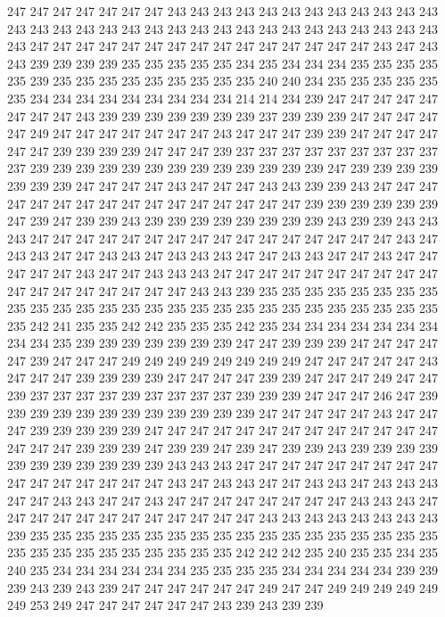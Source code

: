 247 247 247 247 247 247 247 243 243 243 243 243 243 243 243 243 243 243 243 243
243 243 243 243 243 243 243 243 243 243 243 243 243 243 243 243 243 243 243 247
247 247 247 247 247 247 247 247 247 247 247 247 247 247 243 247 243 243 239 239
239 239 235 235 235 235 235 234 235 234 234 234 235 235 235 235 235 239 235 235
235 235 235 235 235 235 235 240 240 234 235 235 235 235 235 235 234 234 234 234
234 234 234 234 234 214 214 234 239 247 247 247 247 247 247 247 247 243 239 239
239 239 239 239 239 237 239 239 239 247 247 247 247 247 249 247 247 247 247 247
247 247 243 247 247 247 239 239 247 247 247 247 247 247 239 239 239 239 247 247
247 239 237 237 237 237 237 237 237 237 237 237 239 239 239 239 239 239 239 239
239 239 239 239 239 247 239 239 239 239 239 239 239 247 247 247 247 243 247 247
247 243 243 239 239 243 247 247 247 247 247 247 247 247 247 247 247 247 247 247
247 247 239 239 239 239 239 239 247 239 247 239 239 243 239 239 239 239 239 239
239 239 243 239 239 243 243 243 247 247 247 247 247 247 247 247 247 247 247 247
247 247 247 247 243 247 243 243 247 247 243 243 247 243 243 243 247 247 243 243
247 247 243 247 247 247 247 247 243 247 247 243 243 243 247 247 247 247 247 247
247 247 247 247 247 247 247 247 247 247 247 247 243 243 239 235 235 235 235 235
235 235 235 235 235 235 235 235 235 235 235 235 235 235 235 235 235 235 235 235
235 235 235 242 241 235 235 242 242 235 235 235 242 235 234 234 234 234 234 234
234 234 234 235 239 239 239 239 239 239 239 247 247 239 239 239 247 247 247 247
247 239 247 247 247 249 249 249 249 249 249 249 249 247 247 247 247 247 243 247
247 247 239 239 239 239 247 247 247 247 239 239 247 247 247 249 247 247 239 237
237 237 237 239 237 237 237 237 239 239 239 247 247 247 246 247 239 239 239 239
239 239 239 239 239 239 239 239 247 247 247 247 247 243 247 247 247 239 239 239
239 239 247 247 247 247 247 247 247 247 247 247 247 247 247 247 247 247 239 239
239 247 239 239 247 239 247 239 239 243 239 239 239 239 239 239 239 239 239 239
239 243 243 243 247 247 247 247 247 247 247 247 247 247 247 247 247 247 247 247
243 247 243 243 247 247 243 243 247 243 243 243 247 247 243 243 247 247 243 247
247 247 247 247 247 247 247 243 243 243 247 247 247 247 247 247 247 247 247 247
247 247 243 243 243 243 243 243 243 243 239 235 235 235 235 235 235 235 235 235
235 235 235 235 235 235 235 235 235 235 235 235 235 235 235 235 235 235 235 242
242 242 235 240 235 235 234 235 240 235 234 234 234 234 234 234 235 235 235 235
234 234 234 234 234 239 239 239 243 239 243 239 247 247 247 247 247 247 249 247
247 249 249 249 249 249 249 253 249 247 247 247 247 247 247 243 239 243 239 239
